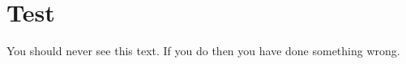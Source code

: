 \documentclass{article}
\begin{document}
\section{Test}

You should never see this text. If you do then you have done something wrong. 



\end{document}
